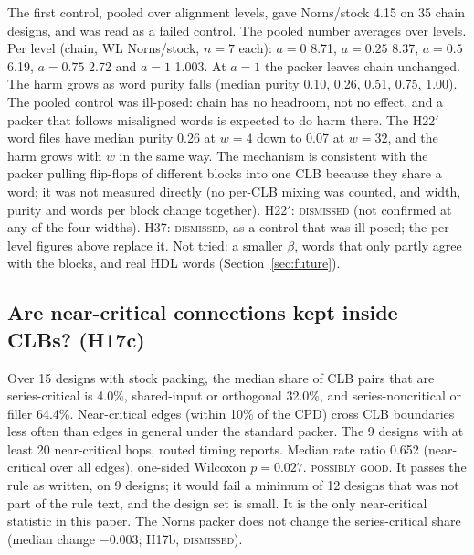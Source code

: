  The first control, pooled over alignment levels, gave Norns/stock 4.15 on 35 chain designs, and was read as a failed control. The pooled number averages over levels. Per level (chain, WL Norns/stock, $n=7$ each): $a=0$ 8.71, $a=0.25$ 8.37, $a=0.5$ 6.19, $a=0.75$ 2.72 and $a=1$ 1.003. %
At $a=1$ the packer leaves chain unchanged. The harm grows as word purity falls (median purity 0.10, 0.26, 0.51, 0.75, 1.00). The pooled control was ill-posed: chain has no headroom, not no effect, and a packer that follows misaligned words is expected to do harm there. The H22$'$ word files have median purity 0.26 at $w=4$ down to 0.07 at $w=32$, and the harm grows with $w$ in the same way. The mechanism is consistent with the packer pulling flip-flops of different blocks into one CLB because they share a word; it was not measured directly (no per-CLB mixing was counted, and width, purity and words per block change together).
 H22$'$: \textsc{dismissed} (not confirmed at any of the four widths). H37: \textsc{dismissed}, as a control that was ill-posed; the per-level figures above replace it. Not tried: a smaller $\beta$, words that only partly agree with the blocks, and real HDL words (Section~\ref{sec:future}).

\subsection{Are near-critical connections kept inside CLBs? (H17c)}
\label{sec:e-census}

 Over 15 designs with stock packing, the median share of CLB pairs that are series-critical is 4.0\%, shared-input or orthogonal 32.0\%, and series-noncritical or filler 64.4\%. %
 Near-critical edges (within 10\% of the CPD) cross CLB boundaries less often than edges in general under the standard packer.
 The 9 designs with at least 20 near-critical hops, routed timing reports.
 Median rate ratio 0.652 (near-critical over all edges), one-sided Wilcoxon $p=0.027$. %
 \textsc{possibly good}. It passes the rule as written, on 9 designs; it would fail a minimum of 12 designs that was not part of the rule text, and the design set is small. It is the only near-critical statistic in this paper. The Norns packer does not change the series-critical share (median change $-0.003$; H17b, \textsc{dismissed}).

